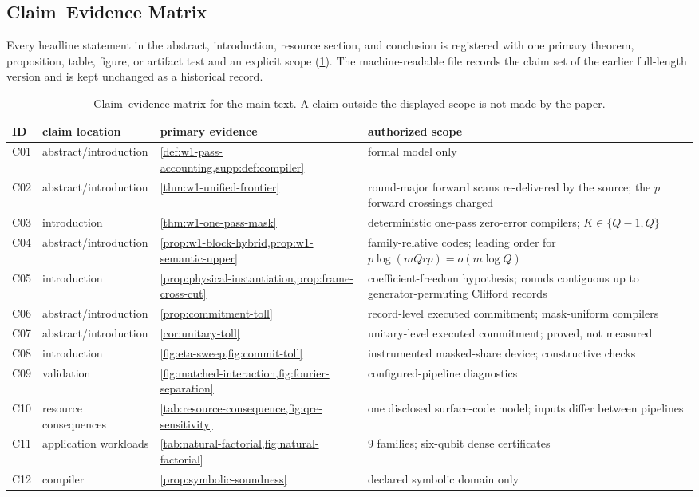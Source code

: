 \subsection{Claim--Evidence Matrix}

Every headline statement in the abstract, introduction, resource section, and
conclusion is registered with one primary theorem, proposition, table, figure,
or artifact test and an explicit scope (\cref{tab:claim-evidence}).  The
machine-readable file 
records the claim set of the earlier full-length version and is kept
unchanged as a historical record.

\begin{table}[tbp]
\centering
\scriptsize
\begin{tabularx}{\textwidth}{@{}l l l X@{}}
\toprule
ID & claim location & primary evidence & authorized scope \\
\midrule
C01 & abstract/introduction & \cref{def:w1-pass-accounting,supp:def:compiler} & formal model only \\
C02 & abstract/introduction & \cref{thm:w1-unified-frontier} & round-major forward scans re-delivered by the source; the $p$ forward crossings charged \\
C03 & introduction & \cref{thm:w1-one-pass-mask} & deterministic one-pass zero-error compilers; $K\in\{Q-1,Q\}$ \\
C04 & abstract/introduction & \cref{prop:w1-block-hybrid,prop:w1-semantic-upper} & family-relative codes; leading order for $p\log(mQrp)=o(m\log Q)$ \\
C05 & introduction & \cref{prop:physical-instantiation,prop:frame-cross-cut} & coefficient-freedom hypothesis; rounds contiguous up to generator-permuting Clifford records \\
C06 & abstract/introduction & \cref{prop:commitment-toll} & record-level executed commitment; mask-uniform compilers \\
C07 & abstract/introduction & \cref{cor:unitary-toll} & unitary-level executed commitment; proved, not measured \\
C08 & introduction & \cref{fig:eta-sweep,fig:commit-toll} & instrumented masked-share device; constructive checks \\
C09 & validation & \cref{fig:matched-interaction,fig:fourier-separation} & configured-pipeline diagnostics \\
C10 & resource consequences & \cref{tab:resource-consequence,fig:qre-sensitivity} & one disclosed surface-code model; inputs differ between pipelines \\
C11 & application workloads & \cref{tab:natural-factorial,fig:natural-factorial} & 9 families; six-qubit dense certificates \\
C12 & compiler & \cref{prop:symbolic-soundness} & declared symbolic domain only \\
\bottomrule
\end{tabularx}
\caption{Claim--evidence matrix for the main text.  A claim outside the
displayed scope is not made by the paper.}
\label{tab:claim-evidence}
\end{table}
